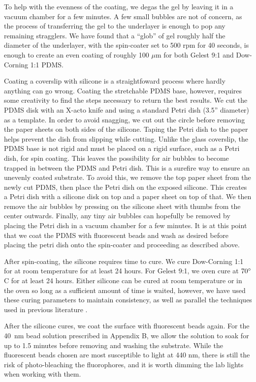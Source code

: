 To help with the evenness of the coating, we degas the gel by leaving it in a vacuum chamber for a few minutes. A few small bubbles are not of concern, as the process of transferring the gel to the underlayer is enough to pop any remaining stragglers. We have found that a ``glob'' of gel roughly half the diameter of the underlayer, with the spin-coater set to 500 rpm for 40 seconds, is enough to create an even coating of roughly 100 $\mu$m for both Gelest 9:1 and Dow-Corning 1:1 PDMS.

Coating a coverslip with silicone is a straightfoward process where hardly anything can go wrong. Coating the stretchable PDMS base, however, requires some creativity to find the steps necessary to return the best results. We cut the PDMS disk with an X-acto knife and using a standard Petri dish (3.5'' diameter) as a template. In order to avoid snagging, we cut out the circle before removing the paper sheets on both sides of the silicone. Taping the Petri dish to the paper helps prevent the dish from slipping while cutting. Unlike the glass coverslip, the PDMS base is not rigid and must be placed on a rigid surface, such as a Petri dish, for spin coating. This leaves the possibility for air bubbles to become trapped in between the PDMS and Petri dish. This is a surefire way to ensure an unevenly coated substrate. To avoid this, we remove the top paper sheet from the newly cut PDMS, then place the Petri dish on the exposed silicone. This creates a Petri dish with a silicone disk on top and a paper sheet on top of that. We then remove the air bubbles by pressing on the silicone sheet with thumbs from the center outwards. Finally, any tiny air bubbles can hopefully be removed by placing the Petri dish in a vacuum chamber for a few minutes. It is at this point that we coat the PDMS with fluorescent beads and wash as desired before placing the petri dish onto the spin-coater and proceeding as described above.

After spin-coating, the silicone requires time to cure. We cure Dow-Corning 1:1 for at room temperature for at least 24 hours. For Gelest 9:1, we oven cure at $70 \degree$ C for at least 24 hours. Either silicone can be cured at room temperature or in the oven so long as a sufficient amount of time is waited, however, we have used these curing parameters to maintain consistency, as well as parallel the techniques used in previous literature \cite{xu2017direct}.

After the silicone cures, we coat the surface with fluorescent beads again. For the 40~nm bead solution prescribed in Appendix B, we allow the solution to soak for up to 1.5 minutes before removing and washing the substrate. While the fluorescent beads chosen are most susceptible to light at 440 nm, there is still the risk of photo-bleaching the fluorophores, and it is worth dimming the lab lights when working with them. 

